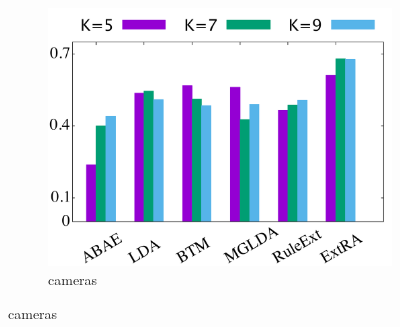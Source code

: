 \begin{figure}[!ht]
\begin{subfigure}{.333\textwidth}
		\includegraphics[width=\linewidth]{figures/cameras_s}
		\caption{cameras}
		\label{fig:cameras_s}
	\end{subfigure}
	

\end{figure}
